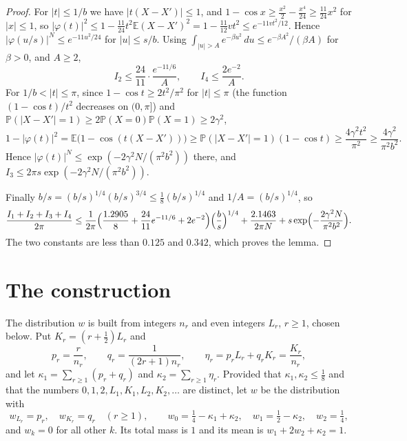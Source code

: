 \documentclass[11pt]{amsart}
\numberwithin{equation}{section}
\newcommand{\Pp}{\mathbb P}
\newcommand{\E}{\mathbb E}
\begin{document}
\begin{proof}
For $|t|\le1/b$ we have $|t(X-X')|\le1$, and $1-\cos x\ge\frac{x^2}2-\frac{x^4}{24}\ge\frac{11}{24}x^2$ for $|x|\le1$, so $|\varphi(t)|^2\le1-\frac{11}{24}t^2\E(X-X')^2=1-\frac{11}{12}vt^2\le e^{-11vt^2/12}$. Hence $|\varphi(u/s)|^N\le e^{-11u^2/24}$ for $|u|\le s/b$. Using $\int_{|u|>A}e^{-\beta u^2}\,du\le e^{-\beta A^2}/(\beta A)$ for $\beta>0$, and $A\ge2$,
\[
I_2\le\frac{24}{11}\cdot\frac{e^{-11/6}}{A},\qquad I_4\le\frac{2e^{-2}}{A}.
\]
For $1/b<|t|\le\pi$, since $1-\cos t\ge2t^2/\pi^2$ for $|t|\le\pi$ \textup{(}the function $(1-\cos t)/t^2$ decreases on $(0,\pi]$\textup{)} and $\Pp(|X-X'|=1)\ge2\Pp(X=0)\Pp(X=1)\ge2\gamma^2$,
\[
1-|\varphi(t)|^2=\E\bigl(1-\cos(t(X-X'))\bigr)\ge\Pp(|X-X'|=1)(1-\cos t)\ge\frac{4\gamma^2t^2}{\pi^2}\ge\frac{4\gamma^2}{\pi^2b^2}.
\]
Hence $|\varphi(t)|^N\le\exp(-2\gamma^2N/(\pi^2b^2))$ there, and $I_3\le2\pi s\exp(-2\gamma^2N/(\pi^2b^2))$.

Finally $b/s=(b/s)^{1/4}(b/s)^{3/4}\le\frac18(b/s)^{1/4}$ and $1/A=(b/s)^{1/4}$, so
\[
\frac{I_1+I_2+I_3+I_4}{2\pi}\le\frac1{2\pi}\Bigl(\frac{1.2905}8+\frac{24}{11}e^{-11/6}+2e^{-2}\Bigr)\Bigl(\frac bs\Bigr)^{1/4}+\frac{2.1463}{2\pi N}+s\exp\Bigl(-\frac{2\gamma^2N}{\pi^2b^2}\Bigr).
\]
The two constants are less than $0.125$ and $0.342$, which proves the lemma.
\end{proof}

\section{The construction}\label{sec:construction}

The distribution $w$ is built from integers $n_r$ and even integers $L_r$, $r\ge1$, chosen below. Put $K_r=(r+\frac12)L_r$ and
\begin{equation}\label{eq:atoms}
p_r=\frac r{n_r},\qquad q_r=\frac1{(2r+1)n_r},\qquad \eta_r=p_rL_r+q_rK_r=\frac{K_r}{n_r},
\end{equation}
and let $\kappa_1=\sum_{r\ge1}(p_r+q_r)$ and $\kappa_2=\sum_{r\ge1}\eta_r$. Provided that $\kappa_1,\kappa_2\le\frac18$ and that the numbers $0,1,2,L_1,K_1,L_2,K_2,\dots$ are distinct, let $w$ be the distribution with
\begin{equation}\label{eq:w}
w_{L_r}=p_r,\quad w_{K_r}=q_r\quad(r\ge1),\qquad w_0=\tfrac14-\kappa_1+\kappa_2,\quad w_1=\tfrac12-\kappa_2,\quad w_2=\tfrac14,
\end{equation}
and $w_k=0$ for all other $k$. Its total mass is $1$ and its mean is $w_1+2w_2+\kappa_2=1$.
\end{document}
